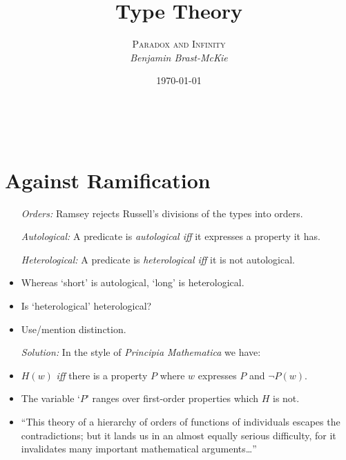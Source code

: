 \documentclass[a4paper, 11pt]{article} %
\title{\textbf{Type Theory}} %
\author{\textsc{Paradox and Infinity}\\ \em Benjamin Brast-McKie} %
\date{\today} %
\makeatletter
\renewcommand{\maketitle}{ %
\begin{flushright} %
{\LARGE\@title} %

\vspace{10pt} %

{\@author} %
\\\@date %

\vspace{-20pt} %
\end{flushright}
}
\makeatother
\begin{document}
\maketitle %

\thispagestyle{empty}



\section*{Against Ramification}

  \begin{itemize}
    \item[\it Orders:] Ramsey rejects Russell's divisions of the types into orders.
    \item[\it Autological:] A predicate is \textit{autological iff} it expresses a property it has.
    \item[\it Heterological:] A predicate is \textit{heterological iff} it is not autological.
      \item Whereas `short' is autological, `long' is heterological.
      \item Is `heterological' heterological?
      \item Use/mention distinction.
    \item[\it Solution:] In the style of \textit{Principia Mathematica} we have:
      \item $H(w)$ \textit{iff} there is a property $P$ where $w$ expresses $P$ and $\neg P(w)$.
      \item The variable `$P$' ranges over first-order properties which $H$ is not. 
      \item ``This theory of a hierarchy of orders of functions of individuals escapes the contradictions; but it lands us in an almost equally serious difficulty, for it invalidates many important mathematical arguments\ldots''
  \end{itemize}
\end{document}
